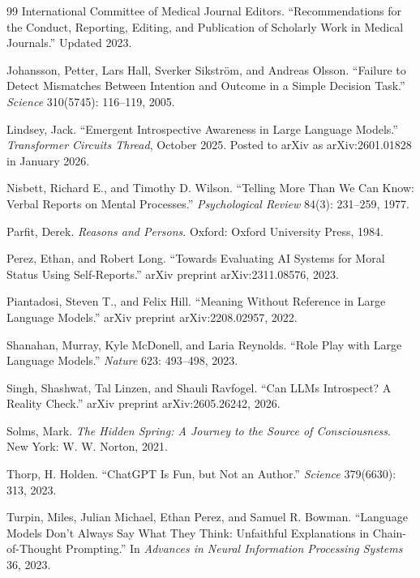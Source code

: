 \documentclass[12pt]{article}
\theoremstyle{definition}
\theoremstyle{plain}
\begin{document}
\begin{thebibliography}{99}
International Committee of Medical Journal Editors. ``Recommendations for the Conduct, Reporting, Editing, and Publication of Scholarly Work in Medical Journals.'' Updated 2023.

Johansson, Petter, Lars Hall, Sverker Sikstr\"om, and Andreas Olsson. ``Failure to Detect Mismatches Between Intention and Outcome in a Simple Decision Task.'' \emph{Science} 310(5745): 116--119, 2005.

Lindsey, Jack. ``Emergent Introspective Awareness in Large Language Models.'' \emph{Transformer Circuits Thread}, October 2025. Posted to arXiv as arXiv:2601.01828 in January 2026.

Nisbett, Richard E., and Timothy D. Wilson. ``Telling More Than We Can Know: Verbal Reports on Mental Processes.'' \emph{Psychological Review} 84(3): 231--259, 1977.

Parfit, Derek. \emph{Reasons and Persons}. Oxford: Oxford University Press, 1984.

Perez, Ethan, and Robert Long. ``Towards Evaluating AI Systems for Moral Status Using Self-Reports.'' arXiv preprint arXiv:2311.08576, 2023.

Piantadosi, Steven T., and Felix Hill. ``Meaning Without Reference in Large Language Models.'' arXiv preprint arXiv:2208.02957, 2022.

Shanahan, Murray, Kyle McDonell, and Laria Reynolds. ``Role Play with Large Language Models.'' \emph{Nature} 623: 493--498, 2023.

Singh, Shashwat, Tal Linzen, and Shauli Ravfogel. ``Can LLMs Introspect? A Reality Check.'' arXiv preprint arXiv:2605.26242, 2026.

Solms, Mark. \emph{The Hidden Spring: A Journey to the Source of Consciousness}. New York: W. W. Norton, 2021.

Thorp, H. Holden. ``ChatGPT Is Fun, but Not an Author.'' \emph{Science} 379(6630): 313, 2023.

Turpin, Miles, Julian Michael, Ethan Perez, and Samuel R. Bowman. ``Language Models Don't Always Say What They Think: Unfaithful Explanations in Chain-of-Thought Prompting.'' In \emph{Advances in Neural Information Processing Systems} 36, 2023.

\end{thebibliography}
\end{document}
